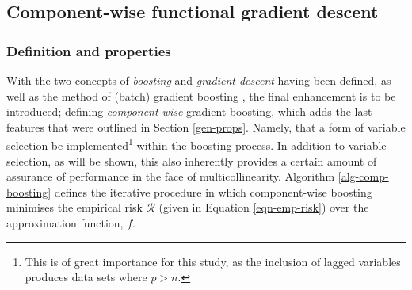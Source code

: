 \documentclass{article}
\begin{document}
\pagebreak


\subsection{Component-wise functional gradient descent \label{comp-boosting}}
\label{sec-1-4}


\subsubsection{Definition and properties \label{comp-alg}}
\label{sec-1-4-1}

With the two concepts of \emph{boosting} and \emph{gradient descent} having been defined, as well as the method of (batch) gradient boosting \cite{friedman2001greedy}, the final enhancement is to be introduced; defining \emph{component-wise} gradient boosting, which adds the last features that were outlined in Section \ref{gen-props}. Namely, that a form of variable selection be implemented\footnote{This is of great importance for this study, as the inclusion of lagged variables produces data sets where $p > n$.} within the boosting process. In addition to variable selection, as will be shown, this also inherently provides a certain amount of assurance of performance in the face of multicollinearity. Algorithm \eqref{alg-comp-boosting} defines the iterative procedure in which component-wise boosting minimises the empirical risk $\mathcal{R}$ (given in Equation \eqref{eqn-emp-risk}) over the approximation function, $f$.

\vspace{5mm}
\end{document}
